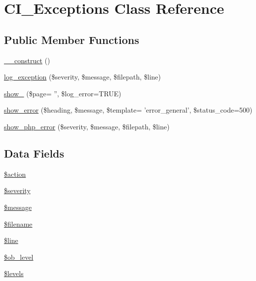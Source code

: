 \hypertarget{class_c_i___exceptions}{\section{C\-I\-\_\-\-Exceptions Class Reference}
\label{class_c_i___exceptions}
}
\subsection*{Public Member Functions}
\begin{DoxyCompactItemize}
\item 
\hyperlink{class_c_i___exceptions_a095c5d389db211932136b53f25f39685}{\-\_\-\-\_\-construct} ()
\item 
\hyperlink{class_c_i___exceptions_a477bd3360509887aeb6e0a56bcdcad2a}{log\-\_\-exception} (\$severity, \$message, \$filepath, \$line)
\item 
\hyperlink{class_c_i___exceptions_a7ec82c1b0d3bbeb9338f236a1755a2a5}{show\-\_} (\$page= '', \$log\-\_\-error=T\-R\-U\-E)
\item 
\hyperlink{class_c_i___exceptions_af68ad4102f7a42f9aaf68c40afe6d02c}{show\-\_\-error} (\$heading, \$message, \$template= 'error\-\_\-general', \$status\-\_\-code=500)
\item 
\hyperlink{class_c_i___exceptions_a7962c30cacf1341dac1c44d8ab57cebe}{show\-\_\-php\-\_\-error} (\$severity, \$message, \$filepath, \$line)
\end{DoxyCompactItemize}
\subsection*{Data Fields}
\begin{DoxyCompactItemize}
\item 
\hyperlink{class_c_i___exceptions_aa698a3e72116e8e778be0e95d908ee30}{\$action}
\item 
\hyperlink{class_c_i___exceptions_a85759894d444d7191251479d87eaf8c6}{\$severity}
\item 
\hyperlink{class_c_i___exceptions_abf17cb2dba2ed17cb28aa5f37deb5293}{\$message}
\item 
\hyperlink{class_c_i___exceptions_a0722441477f957078ee2437054556cbc}{\$filename}
\item 
\hyperlink{class_c_i___exceptions_a52f469b0182d9abac2d0f20548680c9c}{\$line}
\item 
\hyperlink{class_c_i___exceptions_abb6b6587dbaf0238bf26829c8df05d59}{\$ob\-\_\-level}
\item 
\hyperlink{class_c_i___exceptions_a1035dc0448354cc79f8f9e1ca8dfd0cb}{\$levels}
\end{DoxyCompactItemize}


